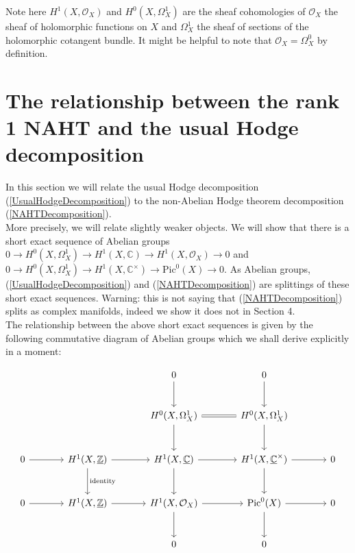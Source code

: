 Note here $H^1 ( X, \mathcal{O} _X )$ and $H^0 (X,\Omega_X ^1 )$ are the sheaf cohomologies of $\mathcal{O}_{X}$ the sheaf of holomorphic functions on $X$ and $\Omega_X ^1$ the sheaf of sections of the holomorphic cotangent bundle. It might be helpful to note that $\mathcal{O} _X=\Omega_X ^0$ by definition.\\

\section{The relationship between the rank 1 NAHT and the usual Hodge decomposition}

In this section we will relate the usual Hodge decomposition (\ref{UsualHodgeDecomposition}) to the non-Abelian Hodge theorem decomposition (\ref{NAHTDecomposition}).\\

More precisely, we will relate slightly weaker objects. We will show that there is a short exact sequence of Abelian groups $0\rightarrow H^0 (X,\Omega_X ^1 )\rightarrow H^1 (X, \mathbb{C})\rightarrow H^1 ( X, \mathcal{O} _X )\rightarrow 0$ and  $0\rightarrow H^0 (X,\Omega_X ^1 )\rightarrow H^1(X, \mathbb{C}^\times)\rightarrow\mathrm{Pic}^0 (X)\rightarrow 0$. As Abelian groups, (\ref{UsualHodgeDecomposition}) and (\ref{NAHTDecomposition}) are splittings of these short exact sequences. Warning: this is not saying that (\ref{NAHTDecomposition}) splits as complex manifolds, indeed we show it does not in Section 4.\\

The relationship between the above short exact sequences is given by the following commutative diagram of Abelian groups which we shall derive explicitly in a moment:

\begin{equation}\label{TheDiagram}
\begin{tikzcd}[sep=large]
& & 0 \arrow[d] & 0 \arrow[d] &  \\
& & H^{0}(X,\Omega_{X}^{1}) \arrow[equal,r] \arrow[d]  & H^{0}(X,\Omega_{X}^{1}) \arrow[d] & \\
0 \arrow[r] & H^{1}(X,\underline{\mathbb{Z}} \arrow[r] \arrow[d, "\textrm{identity}"]) & H^{1}(X,\underline{\mathbb{C}}) \arrow[r] \arrow[d]  & H^{1}(X,\underline{\mathbb{C}}^\times) \arrow[d] \arrow[r] & 0 \\
0 \arrow[r] & H^{1}(X,\underline{\mathbb{Z}}) \arrow[r] & H^{1}(X,\mathcal{O}_{X}) \arrow[r] \arrow[d] & \textrm{Pic}^{0}(X) \arrow[r] \arrow[d] & 0\\
& & 0 & 0& 
\end{tikzcd}
\end{equation}

